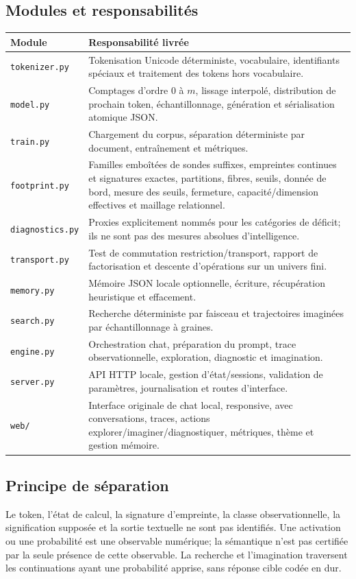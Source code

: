 \documentclass[11pt,a4paper]{article}
\begin{document}
\subsection{Modules et responsabilités}
\begin{longtable}{p{}p{}}
\toprule Module & Responsabilité livrée \\
\midrule
\texttt{tokenizer.py} & Tokenisation Unicode déterministe, vocabulaire, identifiants spéciaux et traitement des tokens hors vocabulaire. \\
\texttt{model.py} & Comptages d'ordre 0 à $m$, lissage interpolé, distribution de prochain token, échantillonnage, génération et sérialisation atomique JSON. \\
\texttt{train.py} & Chargement du corpus, séparation déterministe par document, entraînement et métriques. \\
\texttt{footprint.py} & Familles emboîtées de sondes suffixes, empreintes continues et signatures exactes, partitions, fibres, seuils, donnée de bord, mesure des seuils, fermeture, capacité/dimension effectives et maillage relationnel. \\
\texttt{diagnostics.py} & Proxies explicitement nommés pour les catégories de déficit; ils ne sont pas des mesures absolues d'intelligence. \\
\texttt{transport.py} & Test de commutation restriction/transport, rapport de factorisation et descente d'opérations sur un univers fini. \\
\texttt{memory.py} & Mémoire JSON locale optionnelle, écriture, récupération heuristique et effacement. \\
\texttt{search.py} & Recherche déterministe par faisceau et trajectoires imaginées par échantillonnage à graines. \\
\texttt{engine.py} & Orchestration chat, préparation du prompt, trace observationnelle, exploration, diagnostic et imagination. \\
\texttt{server.py} & API HTTP locale, gestion d'état/sessions, validation de paramètres, journalisation et routes d'interface. \\
\texttt{web/} & Interface originale de chat local, responsive, avec conversations, traces, actions explorer/imaginer/diagnostiquer, métriques, thème et gestion mémoire. \\
\bottomrule
\end{longtable}
\subsection{Principe de séparation}
Le token, l'état de calcul, la signature d'empreinte, la classe observationnelle, la signification supposée et la sortie textuelle ne sont pas identifiés. Une activation ou une probabilité est une observable numérique; la sémantique n'est pas certifiée par la seule présence de cette observable. La recherche et l'imagination traversent les continuations ayant une probabilité apprise, sans réponse cible codée en dur.
\end{document}
